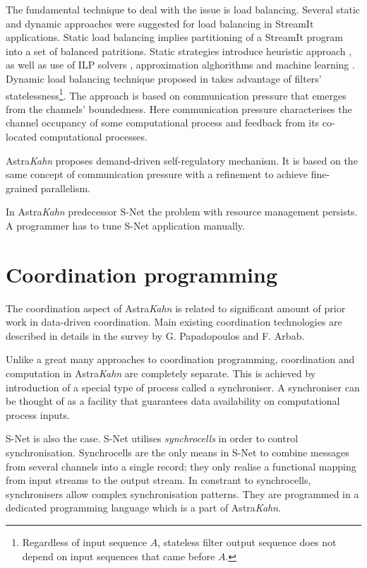 The fundamental technique to deal with the issue is load balancing. Several static and dynamic approaches were suggested for load balancing in StreamIt applications. Static load balancing implies partitioning of a StreamIt program into a set of balanced patritions. Static strategies introduce heuristic approach \cite{streamit}, as well as use of ILP solvers \cite{kudlur}, approximation alghorithms \cite{farhad} and machine learning \cite{wang}. Dynamic load balancing technique proposed in \cite{collins} takes advantage of filters' statelessness\footnote{Regardless of input sequence $A$, stateless filter output sequence does not depend on input sequences that came before $A$.}. The approach is based on communication pressure that emerges from the channels' boundedness. Here communication pressure characterises the channel occupancy of some computational process and feedback from its co-located computational processes.

Astra\emph{Kahn} proposes demand-driven self-regulatory mechanism. It is based on the same concept of communication pressure with a refinement to achieve fine-grained parallelism.

In Astra\emph{Kahn} predecessor S-Net \cite{snet_intro} the problem with resource management persists. A programmer has to tune S-Net application manually.


    \section{Coordination programming}
The coordination aspect of Astra\emph{Kahn} is related to significant amount of prior work in data-driven coordination. Main existing coordination technologies are described in details in the survey \cite{papadopoulos} by G. Papadopoulos and F. Arbab.

Unlike a great many approaches to coordination programming, coordination and computation in Astra\emph{Kahn} are completely separate. This is achieved by introduction of a special type of process called a synchroniser. A synchroniser can be thought of as a facility that guarantees data availability on computational process inputs.

S-Net is also the case. S-Net utilises \emph{synchrocells} in order to control synchronisation. Synchrocells are the only means in S-Net to combine messages from several channels into a single record; they only realise a functional mapping from input streams to the output stream. In constrant to synchrocells, synchronisers allow complex synchronisation patterns. They are programmed in a dedicated programming language which is a part of Astra\emph{Kahn}.

